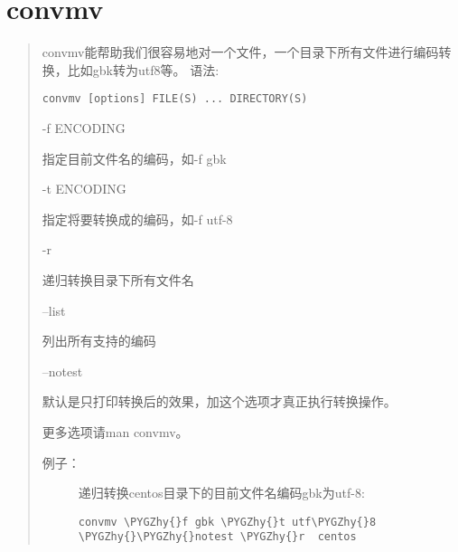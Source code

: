 \documentclass[letterpaper,10pt,english]{sphinxmanual}
\def\PYGZhy{\char`\-}
\begin{document}
\section{convmv}
\label{index:convmv}\begin{quote}

convmv能帮助我们很容易地对一个文件，一个目录下所有文件进行编码转换，比如gbk转为utf8等。
语法:

\begin{Verbatim}[commandchars=\\\{\}]
convmv [options] FILE(S) ... DIRECTORY(S)
\end{Verbatim}
\begin{description}
\item[{主要选项：}] \leavevmode
\begin{DUlineblock}{0em}
\item[] -f ENCODING
\item[]
\begin{DUlineblock}{\DUlineblockindent}
\item[] 指定目前文件名的编码，如-f gbk
\end{DUlineblock}
\item[] -t ENCODING
\item[]
\begin{DUlineblock}{\DUlineblockindent}
\item[] 指定将要转换成的编码，如-f utf-8
\end{DUlineblock}
\item[] -r
\item[]
\begin{DUlineblock}{\DUlineblockindent}
\item[] 递归转换目录下所有文件名
\end{DUlineblock}
\item[] --list
\item[]
\begin{DUlineblock}{\DUlineblockindent}
\item[] 列出所有支持的编码
\end{DUlineblock}
\item[] --notest
\item[]
\begin{DUlineblock}{\DUlineblockindent}
\item[] 默认是只打印转换后的效果，加这个选项才真正执行转换操作。
\end{DUlineblock}
\end{DUlineblock}

\end{description}

更多选项请man convmv。
\begin{description}
\item[{例子：}] \leavevmode
递归转换centos目录下的目前文件名编码gbk为utf-8:

\begin{Verbatim}[commandchars=\\\{\}]
convmv \PYGZhy{}f gbk \PYGZhy{}t utf\PYGZhy{}8 \PYGZhy{}\PYGZhy{}notest \PYGZhy{}r  centos
\end{Verbatim}

\end{description}
\end{quote}
\end{document}
